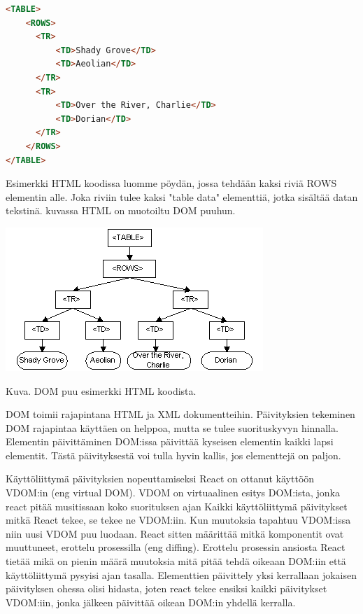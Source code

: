     
\begin{tcolorbox}
\begin{lstlisting}[language=html]
<TABLE>
    <ROWS> 
      <TR> 
          <TD>Shady Grove</TD>
          <TD>Aeolian</TD> 
      </TR> 
      <TR>
          <TD>Over the River, Charlie</TD>
          <TD>Dorian</TD> 
      </TR> 
    </ROWS>
</TABLE>
\end{lstlisting}
\end{tcolorbox}


Esimerkki HTML koodissa luomme pöydän, jossa tehdään kaksi riviä ROWS elementin alle. 
Joka riviin tulee kaksi "table data"{} elementtiä, jotka sisältää datan tekstinä.
kuvassa \nextImageCount {} HTML on muotoiltu DOM puuhun.
\bigskip



\includegraphics{./src/public/oppar/dom.png}

Kuva\getImgCount .{} DOM puu esimerkki HTML koodista. 
\medskip



DOM toimii rajapintana HTML ja XML dokumentteihin.
Päivityksien tekeminen DOM rajapintaa käyttäen on helppoa, mutta se tulee suorituskyvyn hinnalla.
Elementin päivittäminen DOM:issa päivittää kyseisen elementin kaikki lapsi elementit. 
Tästä päivityksestä voi tulla hyvin kallis, jos elementtejä on paljon.

\bigskip




Käyttöliittymä päivityksien nopeuttamiseksi React on ottanut käyttöön VDOM:in (eng virtual DOM).
VDOM on virtuaalinen esitys DOM:ista, jonka react pitää musitissaan koko suorituksen ajan
Kaikki käyttöliittymä päivitykset mitkä React tekee, se tekee ne VDOM:iin.
Kun muutoksia tapahtuu VDOM:issa niin uusi VDOM puu luodaan. React sitten määrittää mitkä komponentit ovat muuttuneet, erottelu prosessilla (eng diffing).
Erottelu prosessin ansiosta React tietää mikä on pienin määrä muutoksia mitä pitää tehdä oikeaan DOM:iin että käyttöliittymä pysyisi ajan tasalla.
Elementtien päivittely yksi kerrallaan jokaisen päivityksen ohessa olisi hidasta,
joten react tekee ensiksi kaikki päivitykset VDOM:iin, jonka jälkeen päivittää oikean DOM:in yhdellä kerralla.\citemissing
\medskip



